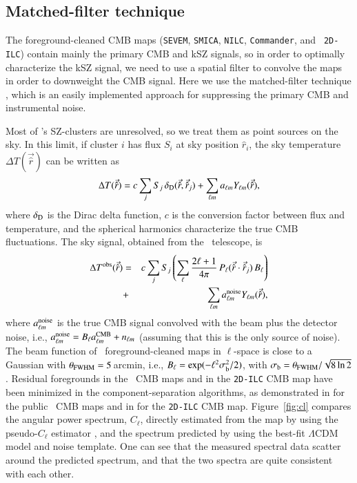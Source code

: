 \documentclass[traditabstract, longauth]{aa}
\newcommand{\nilc}{{\tt NILC}}
\newcommand{\sevem}{{\tt SEVEM}}
\newcommand{\smica}{{\tt SMICA}}
\newcommand{\commander}{{\tt Commander}}
\newcommand{\1}{\'\i }
\begin{document}
\subsection{Matched-filter technique}
\label{sec:filter}

The foreground-cleaned CMB maps (\sevem, \smica, \nilc, \commander, and {\tt
2D-ILC}) contain mainly the primary CMB and kSZ signals, so in order to
optimally characterize the kSZ signal, we need to use a spatial filter to
convolve the maps in order to downweight the CMB signal. Here we use the
matched-filter technique \citep[e.g.,][]{Tegmark98,Ma13}, which is an easily
implemented approach for suppressing the primary CMB and instrumental noise.

Most of \Planck's SZ-clusters are unresolved, so we treat them as point
sources on the sky.  In this limit, if cluster $i$ has flux $S_i$ at sky
position $\hat{r}_i$, the sky temperature $\Delta T(\vec{\hat{r}})$ can be
written as
\begin{eqnarray}
  \Delta T(\vec{\hat{r}}) = c \sum_{j} S_j\,
  \delta_{\rm D}(\vec{\hat{r}},\vec{\hat{r}}_{j}) + \sum_{\ell m} a_{\ell m}
  Y_{\ell m}(\vec{\hat{r}}), \label{eq:deltaT}
\end{eqnarray}
where $\delta_{\rm D}$ is the Dirac delta function, $c$ is the conversion factor
between flux and temperature, and the
spherical harmonics characterize the true CMB
fluctuations. The sky signal, obtained from the \Planck\ telescope, is
\begin{eqnarray}
  \Delta T^{\rm obs}(\vec{\hat{r}}) & = & c \sum_j S_j \left( \sum_{\ell}
  \frac{2 \ell+1}{4\pi} \, P_{\ell}(\vec{\hat{r}}\cdot \vec{\hat{r}}_{j})
  \, B_{\ell} \right) \nonumber \\ &+& \sum_{\ell m} a^{\rm noise}_{\ell m}
  Y_{\ell m}(\vec{\hat{r}}),
  \label{eq:deltaT2}
\end{eqnarray}
where $a^{\rm noise}_{\ell m}$ is the true CMB signal convolved with the beam
plus the detector noise, i.e., $a^{\rm noise}_{\ell m}=B_{\ell}a^{\rm CMB}_{\ell
m}+n_{\ell m}$ (assuming that this is the only source of noise).
The beam function of \Planck\ foreground-cleaned maps in
$\ell$-space is close to a Gaussian with $\theta_{\rm
FWHM}=5\,$arcmin, i.e., $B_{\ell}=\exp(-\ell^{2}\sigma^{2}_{\rm b}/2)$, with
$\sigma_{\rm b}=\theta_{\rm FWHM}/\sqrt{8\ln 2}$.
Residual foregrounds in the \Planck\ CMB maps and in the {\tt 2D-ILC} CMB
map have been minimized in the component-separation algorithms, as demonstrated
in \citet{planck2014-a11} for the public \Planck\ CMB maps and in
\citet{planck2013-XIII} for the {\tt 2D-ILC} CMB map.
Figure~\ref{fig:cl} compares the angular power spectrum, $C_{\ell}$, directly
estimated from the map by using the pseudo-$C_{\ell}$
estimator \citep{Hivon02}, and the spectrum predicted by using the best-fit
$\Lambda$CDM model and noise template. One can see that the measured spectral
data scatter around the predicted spectrum, and that the two spectra are quite
consistent with each other.
\end{document}
